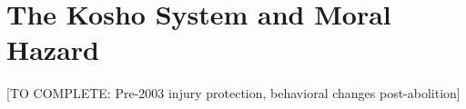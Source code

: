 \section{The Kosho System and Moral Hazard}

[TO COMPLETE: Pre-2003 injury protection, behavioral changes post-abolition]